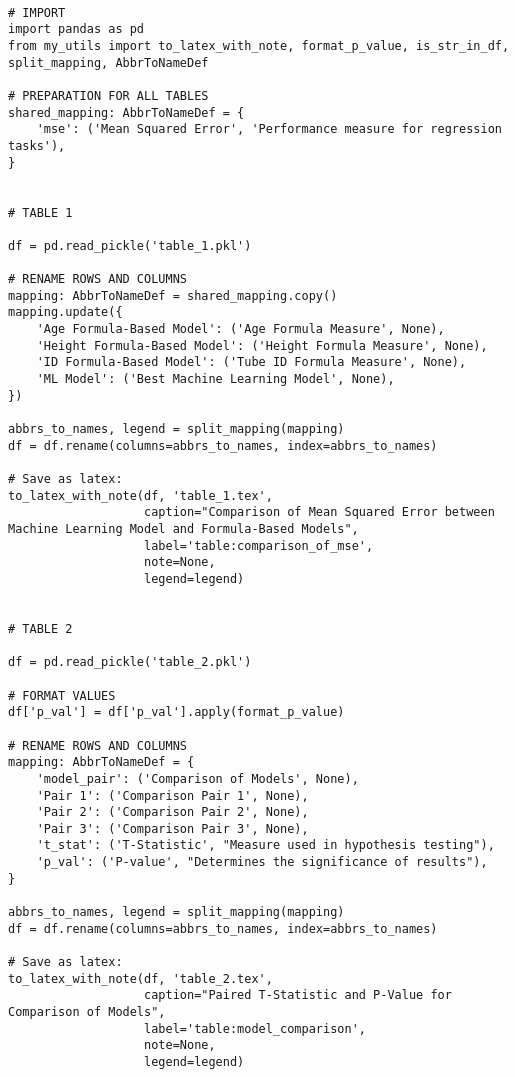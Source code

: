 \documentclass[11pt]{article}
\begin{document}
\begin{verbatim}

# IMPORT
import pandas as pd
from my_utils import to_latex_with_note, format_p_value, is_str_in_df, split_mapping, AbbrToNameDef

# PREPARATION FOR ALL TABLES
shared_mapping: AbbrToNameDef = {
    'mse': ('Mean Squared Error', 'Performance measure for regression tasks'),
}


# TABLE 1

df = pd.read_pickle('table_1.pkl')

# RENAME ROWS AND COLUMNS
mapping: AbbrToNameDef = shared_mapping.copy()
mapping.update({
    'Age Formula-Based Model': ('Age Formula Measure', None),
    'Height Formula-Based Model': ('Height Formula Measure', None),
    'ID Formula-Based Model': ('Tube ID Formula Measure', None),
    'ML Model': ('Best Machine Learning Model', None),
})

abbrs_to_names, legend = split_mapping(mapping)
df = df.rename(columns=abbrs_to_names, index=abbrs_to_names)

# Save as latex:
to_latex_with_note(df, 'table_1.tex',
                   caption="Comparison of Mean Squared Error between Machine Learning Model and Formula-Based Models", 
                   label='table:comparison_of_mse',
                   note=None,
                   legend=legend)


# TABLE 2

df = pd.read_pickle('table_2.pkl')

# FORMAT VALUES 
df['p_val'] = df['p_val'].apply(format_p_value)

# RENAME ROWS AND COLUMNS
mapping: AbbrToNameDef = {
    'model_pair': ('Comparison of Models', None),
    'Pair 1': ('Comparison Pair 1', None),
    'Pair 2': ('Comparison Pair 2', None),
    'Pair 3': ('Comparison Pair 3', None),
    't_stat': ('T-Statistic', "Measure used in hypothesis testing"),
    'p_val': ('P-value', "Determines the significance of results"),
}

abbrs_to_names, legend = split_mapping(mapping)
df = df.rename(columns=abbrs_to_names, index=abbrs_to_names)

# Save as latex:
to_latex_with_note(df, 'table_2.tex',
                   caption="Paired T-Statistic and P-Value for Comparison of Models",
                   label='table:model_comparison',
                   note=None,
                   legend=legend)

\end{verbatim}
\end{document}
